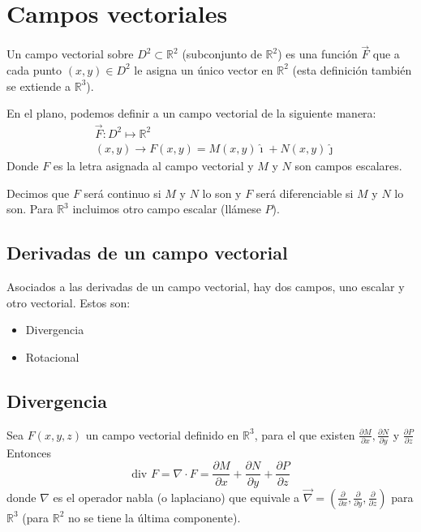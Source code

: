 \section{Campos vectoriales}

Un campo vectorial sobre $D^2 \subset \mathbb{R}^2$ (subconjunto de $\mathbb{R}^2$) es una función $\vec F$ que a cada punto $(x,y)\in D^2$ le asigna un único vector en $\mathbb{R}^2$ (esta definición también se extiende a  $\mathbb{R}^3$).

En el plano, podemos definir a un campo vectorial de la siguiente manera:
\begin{align*}
&\vec F :D^2\mapsto \mathbb{R}^2 \\
&(x,y)\rightarrow F(x,y)=M(x,y)\hat{\imath} + N(x,y)\hat{\jmath}
\end{align*}
Donde $F$ es la letra asignada al campo vectorial y $M$ y $N$ son campos escalares.

Decimos que $F$ será continuo si $M$ y $N$ lo son y $F$ será diferenciable si $M$ y $N$ lo son. Para $\mathbb{R}^3$ incluimos otro campo escalar (llámese $P$).

\subsection{Derivadas de un campo vectorial}

Asociados a las derivadas de un campo vectorial, hay dos campos, uno escalar y otro vectorial. Estos son:
\begin{itemize}
\item Divergencia
\item Rotacional
\end{itemize}

\subsection{Divergencia}

Sea $F(x,y,z)$ un campo vectorial definido en $\mathbb{R}^3$, para el que existen $\frac{\partial M}{\partial x},\frac{\partial N}{\partial y}$ y $\frac{\partial P}{\partial z}$ 
Entonces
$$
\text{div }F = \nabla \cdot F = \frac{\partial M}{\partial x} + \frac{\partial N}{\partial y} + \frac{\partial P}{\partial z}
$$
donde $\nabla$ es el operador nabla (o laplaciano) que equivale a $\vec \nabla = \left(\frac{\partial }{\partial x},\frac{\partial }{\partial y},\frac{\partial }{\partial z} \right)$ para $\mathbb{R}^3$ (para $\mathbb{R}^2$ no se tiene la última componente).

